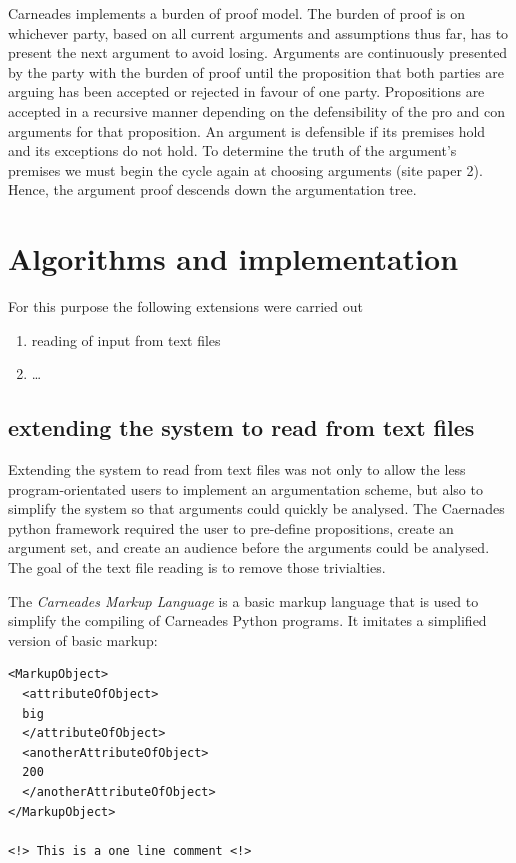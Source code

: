 \documentclass[10pt,a4paper,twocolumn]{article}
\begin{document}
Carneades implements a burden of proof model. The burden of proof is on
whichever party, based on all current arguments and assumptions thus far, has to present the
next argument to avoid losing. Arguments are continuously presented by the party with the
burden of proof until the proposition that both parties are arguing has been
accepted or rejected in favour of one party. Propositions are accepted in
a recursive manner depending on the defensibility of the pro and con arguments
for that proposition.
An argument is defensible if its premises hold and its exceptions do not hold.
To determine the truth of the argument's premises we must begin the cycle again at choosing
arguments (site paper 2). Hence, the
argument proof descends down the argumentation tree.

\section{Algorithms and implementation}

For this purpose the following extensions were carried out
\begin{enumerate}
\item reading of input from text files
\item \dots
\end{enumerate}

\subsection{extending the system to read from text files}

Extending the system to read from text files was not only to allow the less
program-orientated users to implement an argumentation scheme, but also to
simplify the system so that arguments could quickly be analysed. The Caernades
python framework required the user to pre-define propositions, create an
argument set, and create an audience before the arguments could be analysed. The
goal of the text file reading is to remove those trivialties.

The \textit{Carneades Markup Language} is a basic markup language that is used 
to simplify the compiling of Carneades Python programs. It imitates a 
simplified version of basic markup:

\begin{lstlisting}
<MarkupObject>
  <attributeOfObject>
  big
  </attributeOfObject>
  <anotherAttributeOfObject>
  200
  </anotherAttributeOfObject>
</MarkupObject>

<!> This is a one line comment <!>
\end{lstlisting}
\end{document}
